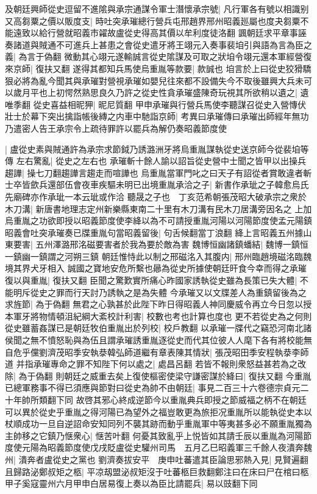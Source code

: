 及朝廷興師從史逗留不進隂與承宗通謀令軍士潛懷承宗號|{
	凡行軍各有號以相識别}
又高芻粟之價以販度支|{
	時吐突承璀總行營兵屯邢趙界邢州昭義廵屬也度夬芻粟不能遠致以給行營就昭義市糴故盧從史得高其價以牟利度徒洛翻}
諷朝廷求平章事誣奏諸道與賊通不可進兵上甚患之會從史遣牙將王翊元入奏事裴垍引與語為言為臣之義|{
	為言于偽翻}
微動其心翊元遂輸誠言從史隂謀及可取之狀垍令翊元還本軍經營復來京師|{
	復扶又翻}
遂得其都知兵馬使烏重胤等款要|{
	款誠也}
垍言於上曰從史狡猾驕狠必將為亂今聞其與承璀對營視承璀如嬰兒往來都不設備失今不取後雖興大兵未可以歲月平也上初愕然熟思良久乃許之從史性貪承璀盛陳奇玩視其所欲稍以遺之|{
	遺唯季翻}
從史喜益相昵狎|{
	昵尼質翻}
甲申承璀與行營兵馬使李聽謀召從史入營慱伏壯士於幕下突出擒詣帳後縳之内車中馳詣京師|{
	考異曰承璀傳曰承璀出師經年無功乃遣密人告王承宗令上疏待罪許以罷兵為解仍奏昭義節度使}


|{
	盧從史素與賊通許為承宗求節鉞乃誘潞洲牙將烏重胤謀執從史送京師今從裴垍等傳}
左右驚亂|{
	從史之左右也}
承璀斬十餘人諭以詔旨從史營中士聞之皆甲以出操兵趨譁|{
	操七刀翻趨譁言趨走而喧譁也}
烏重胤當軍門叱之曰天子有詔從者賞敢違者斬士卒皆歛兵還部伍會夜車疾驅未明已出境重胤承洽之子|{
	新書作承玼之子韓愈烏氏先廟碑亦作承玼一本云玼或作洽}
聽晟之子也　丁亥范希朝張茂昭大破承宗之衆於木刀溝|{
	新唐書地理志定州新樂縣東南二十里有木刀溝有民木刀居溝旁因名之}
上加烏重胤之功欲即授以昭義節度使李絳以為不可請授重胤河陽以河陽節度使孟元陽鎮昭義會吐突承璀奏已牒重胤句當昭義留後|{
	句舌候翻當丁浪翻}
絳上言昭義五州據山東要害|{
	五州澤潞邢洺磁要害者於我為要於敵為害}
魏博恒幽諸鎮蟠結|{
	魏博一鎮恒一鎮幽一鎮謂之河朔三鎮}
朝廷惟恃此以制之邢磁洺入其腹内|{
	邢州臨趙境磁洺臨魏境其界犬牙相入}
誠國之寶地安危所繫也曏為從史所據使朝廷旰食今幸而得之承璀復以與重胤|{
	復扶又翻}
臣聞之驚歎實所痛心昨國家誘執從史雖為長策已失大體|{
	不能明斥從史之罪而行天討乃誘執之是為失體}
今承璀又以文牒差人為重鎮留後為之求旌節|{
	為于偽翻}
無君之心孰甚於此陛下昨日得昭義人神同慶威令再立今日忽以授本軍牙將物情頓沮紀綱大紊校計利害|{
	校數也考也計算也度也}
更不若從史為之何則從史雖蓄姦謀已是朝廷牧伯重胤出於列校|{
	校戶教翻}
以承璀一牒代之竊恐河南北諸侯聞之無不憤怒恥與為伍且謂承璀誘重胤逐從史而代其位彼人人麾下各有將校能無自危乎儻劉濟茂昭季安執㳟韓弘師道繼有章表陳其情狀|{
	張茂昭田季安程執㳟李師道}
并指承璀專命之罪不知陛下何以處之|{
	處昌呂翻}
若皆不報則衆怒益甚若為之改除|{
	為于偽翻}
則朝廷之威重去矣上復使樞密使梁守謙密謀於絳曰|{
	復扶又翻}
今重胤已總軍務事不得已須應與節對曰從史為帥不由朝廷|{
	事見二百三十六卷德宗貞元二十年帥所類翻下同}
故啓其邪心終成逆節今以重胤典兵即授之節威福之柄不在朝廷可以異於從史乎重胤之得河陽已為望外之福豈敢更為旅拒况重胤所以能執從史本以杖順成功一旦自逆詔命安知同列不襲其跡而動乎重胤軍中等夷甚多必不願重胤獨為主帥移之它鎮乃惬衆心|{
	惬苦叶翻}
何憂其致亂乎上悦皆如其請壬辰以重胤為河陽節度使元陽為昭義節度使戊戌貶盧從史驩州司馬　五月乙巳昭義軍三千餘人夜潰奔魏州|{
	潰奔者盧從史之黨也}
劉濟奏拔安平　庚申吐蕃遣其臣論思邪熱入見|{
	見賢遍翻}
且歸路泌鄭叔矩之柩|{
	平凉刼盟泌叔矩沒于吐蕃柩巨救翻鄭注曰在床曰尸在棺曰柩}
甲子奚寇靈州六月甲申白居易復上奏以為臣比請罷兵|{
	易以豉翻下同}


